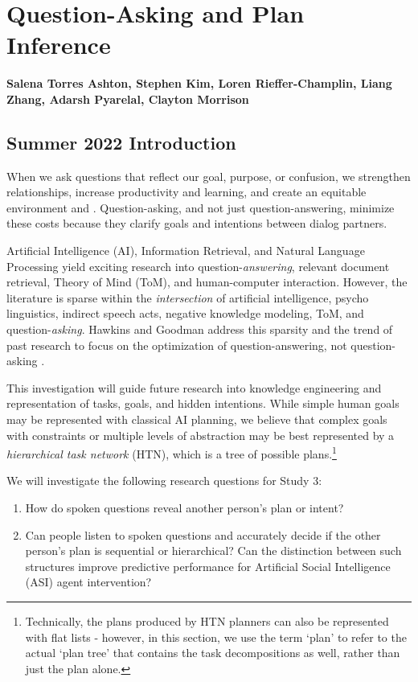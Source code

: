 \chapter{Question-Asking and Plan Inference}
\label{ch:question_plan}
\textbf{Salena Torres Ashton, Stephen Kim, Loren Rieffer-Champlin, Liang Zhang,
Adarsh Pyarelal, Clayton Morrison}


\section{Summer 2022 Introduction}

When we ask questions that reflect our goal, purpose, or confusion,  we strengthen relationships, increase productivity and learning, and create an equitable environment \citet{rothe_lake_gureckis_2018} and \citet{alaimi_2020}. Question-asking, and not just question-answering, minimize these costs because they clarify goals and intentions between dialog partners.

Artificial Intelligence (AI), Information Retrieval, and Natural Language Processing yield exciting research into question-\emph{answering}, relevant document retrieval, Theory of Mind (ToM), and human-computer interaction. However, the literature is sparse within the  \emph{intersection} of artificial intelligence, psycho linguistics, indirect speech acts, negative knowledge modeling, ToM, and question-\emph{asking}. Hawkins and Goodman address this sparsity and the trend of past research to focus on the optimization of question-answering, not question-asking \citet{hawkins_goodman_2017}. 

This investigation will guide future research into knowledge engineering and
representation of tasks, goals, and hidden intentions. While simple human goals
may be represented with classical AI planning, we believe that complex goals with 
constraints or multiple levels of abstraction may be best
represented by a \emph{hierarchical task network} (HTN), which is a tree of possible
plans.\footnote{Technically, the plans produced by HTN planners can also be
    represented with flat lists - however, in this section, we use the term
`plan' to refer to the actual `plan tree' that contains the task decompositions
as well, rather than just the plan alone.}

We will investigate the following research questions for Study 3:

\begin{enumerate}
    \item How do spoken questions reveal another person's plan or intent? 
    \item Can people listen to spoken questions and accurately decide if the
        other person's plan is sequential or hierarchical? Can the
        distinction between such structures improve predictive performance for
        Artificial Social Intelligence (ASI) agent intervention?
\end{enumerate}


